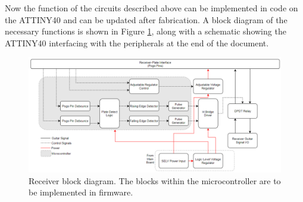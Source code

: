\documentclass{article}
\begin{document}
		Now the function of the circuits described above can be implemented in code on the ATTINY40 and can be updated after fabrication.  A block diagram of the necessary functions is shown in Figure \ref{fig:MicroBlockDiagram}, along with a schematic showing the ATTINY40 interfacing with the peripherals at the end of the document.

		\begin{figure}
			\centering
			\includegraphics[width = \textwidth]{PR2Images/ReceiverBlockDiagramMCU.PNG}
			\caption{Receiver block diagram.  The blocks within the microcontroller are to be implemented in firmware.}
			\label{fig:MicroBlockDiagram}
		\end{figure}




\end{document}
